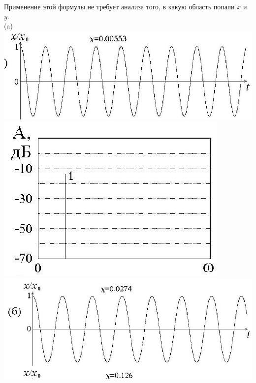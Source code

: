 \documentclass[10pt]{article}
\begin{document}
Применение этой формулы не требует анализа того, в какую область попали $x$ и $y$.\\
(a)\\
\includegraphics[max width=\textwidth, center]{2024_12_13_b73f3d6aa10f4b2a98e9g-043(2)}\\
\includegraphics[max width=\textwidth, center]{2024_12_13_b73f3d6aa10f4b2a98e9g-043}\\
\includegraphics[max width=\textwidth, center]{2024_12_13_b73f3d6aa10f4b2a98e9g-043(3)}\\
\end{document}
